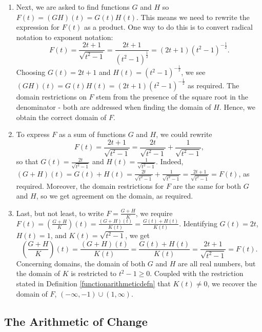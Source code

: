 \documentclass{ximera}
\begin{document}
\begin{example}
\begin{explanation}
\begin{enumerate}
\begin{enumerate}
\item  Next, we are asked to find functions $G$ and $H$ so $F (t) = (GH)(t)  = G(t) H(t)$.  This means we need to rewrite the expression for $F(t)$ as a product. One way to do this is to convert radical notation to exponent notation:  \[ F(t) = \frac{2t+1}{\sqrt{t^2-1}} = \frac{2t+1}{\left(t^2-1 \right)^{\frac{1}{2}}} = (2t+1) \left(t^2-1\right)^{-\frac{1}{2}}. \] Choosing $G(t) = 2t+1$ and $H(t) = \left(t^2-1\right)^{-\frac{1}{2}}$, we see $(GH)(t)  = G(t) H(t) = (2t+1) \left(t^2-1\right)^{-\frac{1}{2}}$ as required.  The domain restrictions on $F$ stem from the presence of the square root in the denominator - both are addressed when finding the domain of $H$.  Hence, we obtain the correct domain of $F$.

\item  To express $F$ as a sum of functions $G$ and $H$, we could rewrite \[ F(t) =  \frac{2t+1}{\sqrt{t^2-1}} = \frac{2t}{\sqrt{t^2-1}} + \frac{1}{\sqrt{t^2-1}},\] so that $G(t) =  \frac{2t}{\sqrt{t^2-1}}$ and $H(t) =  \frac{1}{\sqrt{t^2-1}}$.  Indeed, $(G+H)(t) = G(t)+H(t) =  \frac{2t}{\sqrt{t^2-1}} +  \frac{1}{\sqrt{t^2-1}} = \frac{2t+1}{\sqrt{t^2-1}} = F(t)$, as required.  Moreover, the domain restrictions for $F$ are the same for both $G$ and $H$, so we get agreement on the domain, as required.

\item Last, but not least, to write $F = \frac{G+H}{K}$, we require $F(t) =\left(\frac{G+H}{K}\right)(t) = \frac{(G+H)(t)}{K(t)} = \frac{G(t)+H(t)}{K(t)}$.  Identifying $G(t) = 2t$, $H(t) = 1$, and $K(t) = \sqrt{t^2-1}$, we get \[\left(\frac{G+H}{K}\right)(t) = \frac{(G+H)(t)}{K(t)} = \frac{G(t) + H(t)}{K(t)} = \frac{2t+1}{\sqrt{t^2-1}} = F(t).\]  Concerning domains, the domain of both $G$ and $H$ are all real numbers, but the domain of $K$ is restricted to $t^2-1 \geq 0$.  Coupled with the restriction stated in Definition \ref{functionarithmeticdefn} that $K(t) \neq 0$, we recover the domain of $F$, $(-\infty, -1) \cup (1, \infty)$. 

\end{enumerate}

\end{enumerate}

\end{explanation}

\end{example}

\subsection{The Arithmetic of Change}
\label{rocarithmetic}
\end{document}
